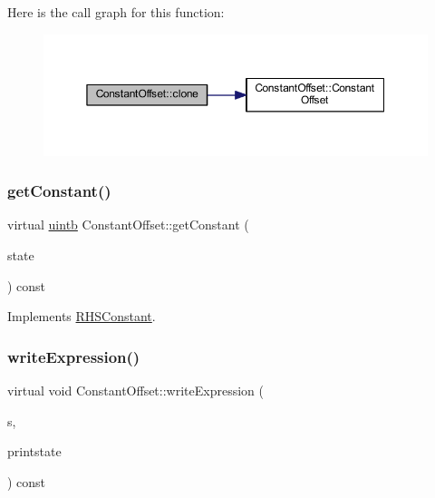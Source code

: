 Here is the call graph for this function\+:
\nopagebreak
\begin{figure}[H]
\begin{center}
\leavevmode
\includegraphics[width=350pt]{class_constant_offset_a0e13d942d1a2f59e329796ccae56c238_cgraph}
\end{center}
\end{figure}
\mbox{\label{class_constant_offset_a6843dd81be2edd35ce23b77f2753c8fe}} 
\subsubsection{\texorpdfstring{getConstant()}{getConstant()}}
{\footnotesize\ttfamily virtual \mbox{\hyperlink{types_8h_a2db313c5d32a12b01d26ac9b3bca178f}{uintb}} Constant\+Offset\+::get\+Constant (\begin{DoxyParamCaption}\item[{\mbox{\hyperlink{class_unify_state}{Unify\+State}} \&}]{state }\end{DoxyParamCaption}) const\hspace{0.3cm}{\ttfamily [virtual]}}



Implements \mbox{\hyperlink{class_r_h_s_constant_a941b5d2898cbce985a3ef9c5db6fa458}{R\+H\+S\+Constant}}.

\mbox{\label{class_constant_offset_ab23c0e4200af433aa78092db6488f727}} 
\subsubsection{\texorpdfstring{writeExpression()}{writeExpression()}}
{\footnotesize\ttfamily virtual void Constant\+Offset\+::write\+Expression (\begin{DoxyParamCaption}\item[{ostream \&}]{s,  }\item[{\mbox{\hyperlink{class_unify_c_printer}{Unify\+C\+Printer}} \&}]{printstate }\end{DoxyParamCaption}) const\hspace{0.3cm}{\ttfamily [virtual]}}



